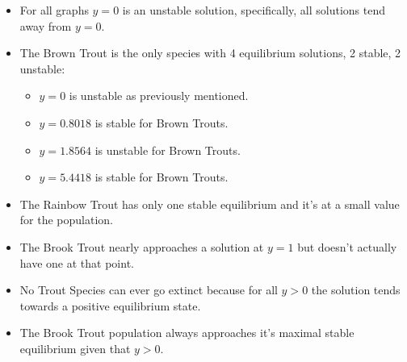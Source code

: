 \documentclass[letterpaper,12pt]{article}
\begin{document}
\begin{itemize}
    \item For all graphs \(y = 0\) is an unstable solution, specifically, all solutions tend away from \(y = 0\).
    \item The Brown Trout is the only species with 4 equilibrium solutions, 2 stable, 2 unstable:
        \begin{itemize}
            \item \(y = 0\) is unstable as previously mentioned.
            \item \(y = 0.8018\) is stable for Brown Trouts.
            \item \(y = 1.8564\) is unstable for Brown Trouts.
            \item \(y = 5.4418\) is stable for Brown Trouts.
        \end{itemize}
    \item The Rainbow Trout has only one stable equilibrium and it's at a small value for the population.
    \item The Brook Trout nearly approaches a solution at \(y = 1\) but doesn't actually have one at that point.
    \item No Trout Species can ever go extinct because for all \(y > 0\) the solution tends towards a positive equilibrium state.
    \item The Brook Trout population always approaches it's maximal stable equilibrium given that \(y > 0\).
\end{itemize}
\end{document}
